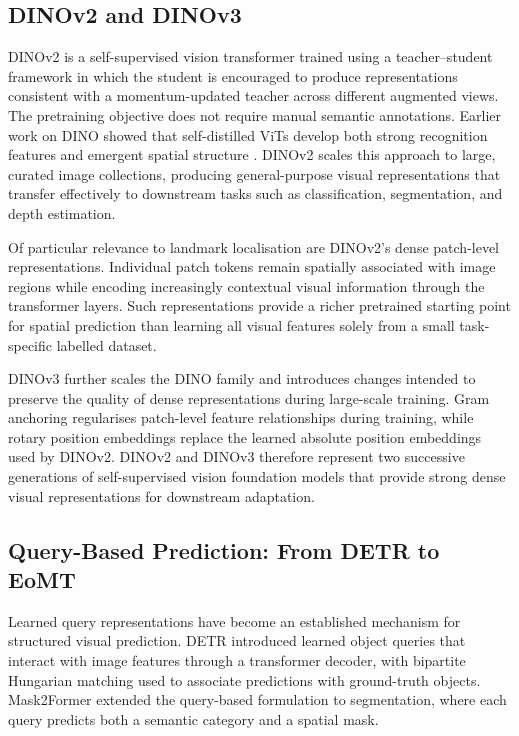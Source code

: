 \subsection{DINOv2 and DINOv3}
\label{sec:bg-dino}

DINOv2 \parencite{oquab2023dinov2} is a self-supervised vision
transformer trained using a teacher--student framework in which the
student is encouraged to produce representations consistent with a
momentum-updated teacher across different augmented views. The
pretraining objective does not require manual semantic annotations.
Earlier work on DINO showed that self-distilled ViTs develop both
strong recognition features and emergent spatial structure
\parencite{caron2021dino}. DINOv2 scales this approach to large,
curated image collections, producing general-purpose visual
representations that transfer effectively to downstream tasks such as
classification, segmentation, and depth estimation.

Of particular relevance to landmark localisation are DINOv2's dense
patch-level representations. Individual patch tokens remain spatially
associated with image regions while encoding increasingly contextual
visual information through the transformer layers. Such
representations provide a richer pretrained starting point for
spatial prediction than learning all visual features solely from a
small task-specific labelled dataset.

DINOv3 \parencite{simeoni2025dinov3} further scales the DINO family
and introduces changes intended to preserve the quality of dense
representations during large-scale training. Gram anchoring
regularises patch-level feature relationships during training, while
rotary position embeddings replace the learned absolute position
embeddings used by DINOv2. DINOv2 and DINOv3 therefore represent two
successive generations of self-supervised vision foundation models
that provide strong dense visual representations for downstream
adaptation.


\subsection{Query-Based Prediction: From DETR to EoMT}
\label{sec:bg-eomt}

Learned query representations have become an established mechanism for
structured visual prediction. DETR \parencite{carion2020detr}
introduced learned object queries that interact with image features
through a transformer decoder, with bipartite Hungarian matching used
to associate predictions with ground-truth objects. Mask2Former
\parencite{cheng2022mask2former} extended the query-based formulation
to segmentation, where each query predicts both a semantic category
and a spatial mask.

